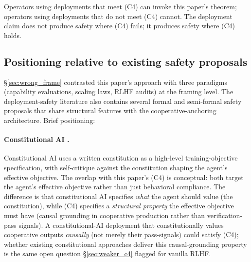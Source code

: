 Operators using deployments that meet (C4) can invoke this paper's
theorem; operators using deployments that do not meet (C4) cannot.
The deployment claim does not produce safety where (C4) fails; it
produces safety where (C4) holds.

\subsection{Positioning relative to existing safety proposals}
\label{sec:disc_related}

\S\ref{sec:wrong_frame} contrasted this paper's approach with three
paradigms (capability evaluations, scaling laws, RLHF audits) at
the framing level.  The deployment-safety literature also contains
several formal and semi-formal safety proposals that share
structural features with the cooperative-anchoring architecture.
Brief positioning:

\paragraph{Constitutional AI \citep{bai2022constitutional}.}
Constitutional AI uses a written constitution as a high-level
training-objective specification, with self-critique against the
constitution shaping the agent's effective objective.  The
overlap with this paper's (C4) is conceptual: both target the
agent's effective objective rather than just behavioral
compliance.  The difference is that constitutional AI specifies
\emph{what} the agent should value (the constitution), while
(C4) specifies a \emph{structural property} the effective
objective must have (causal grounding in cooperative production
rather than verification-pass signals).  A constitutional-AI
deployment that constitutionally values cooperative outputs
\emph{causally} (not merely their pass-signals) could satisfy
(C4); whether existing constitutional approaches deliver this
causal-grounding property is the same open question
\S\ref{sec:weaker_c4} flagged for vanilla RLHF.

